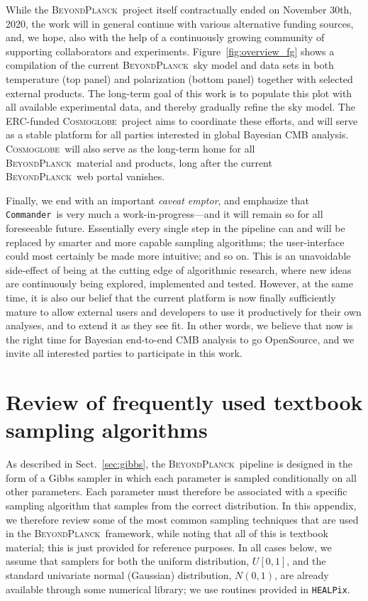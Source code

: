 \documentclass[twocolumn]{aa}
\def\commander{\texttt{Commander}}
\newcommand{\BP}{\textsc{BeyondPlanck}}
\newcommand{\cosmoglobe}{\textsc{Cosmoglobe}}
\newcommand{\HEALPix}[0]{\texttt{HEALPix}}
\begin{document}
While the \BP\ project itself contractually ended on November 30th,
2020, the work will in general continue with various alternative
funding sources, and, we hope, also with the help of a continuously
growing community of supporting collaborators and
experiments. Figure~\ref{fig:overview_fg} shows a compilation of the
current \BP\ sky model and data sets in both temperature (top panel)
and polarization (bottom panel) together with selected external
products. The long-term goal of this work is to populate this plot
with all available experimental data, and thereby gradually refine the
sky model. The ERC-funded \cosmoglobe\ project aims to coordinate
these efforts, and will serve as a stable platform for all parties
interested in global Bayesian CMB analysis. \cosmoglobe\ will also
serve as the long-term home for all \BP\ material and products, long
after the current \BP\ web portal vanishes.

Finally, we end with an important \emph{caveat emptor}, and emphasize
that \commander\ is very much a work-in-progress---and it will
remain so for all foreseeable future. Essentially every single step in
the pipeline can and will be replaced by smarter and more capable
sampling algorithms; the user-interface could most certainly be made
more intuitive; and so on. This is an unavoidable side-effect of being
at the cutting edge of algorithmic research, where new ideas are
continuously being explored, implemented and tested. However, at the
same time, it is also our belief that the current platform is now
finally sufficiently mature to allow external users and developers to
use it productively for their own analyses, and to extend it as they
see fit. In other words, we believe that now is the right time for
Bayesian end-to-end CMB analysis to go OpenSource, and we invite all
interested parties to participate in this work.







\appendix

\section{Review of frequently used textbook sampling algorithms}
\label{app:samplers}

As described in Sect.~\ref{sec:gibbs}, the \BP\ pipeline is designed
in the form of a Gibbs sampler in which each parameter is sampled
conditionally on all other parameters. Each parameter must therefore
be associated with a specific sampling algorithm that samples from the
correct distribution. In this appendix, we therefore review some of
the most common sampling techniques that are used in the
\BP\ framework, while noting that all of this is textbook material;
this is just provided for reference purposes. In all cases below, we
assume that samplers for both the uniform distribution, $U[0,1]$, and
the standard univariate normal (Gaussian) distribution, $N(0,1)$, are
already available through some numerical library; we use routines
provided in \HEALPix.
\end{document}

